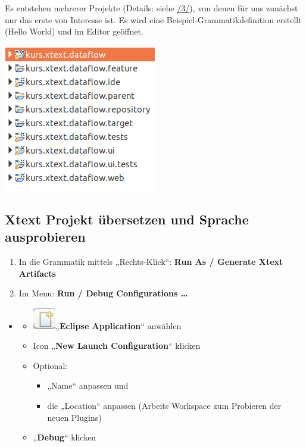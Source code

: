 \documentclass[a4]{article}
\providecommand{\tightlist}{%
  \setlength{\itemsep}{0pt}\setlength{\parskip}{0pt}}
\begin{document}
Es entstehen mehrerer Projekte (Details: siehe
\protect\hyperlink{anchor-3}{/3/}), von denen für uns zunächst nur das
erste von Interesse ist. Es wird eine Beispiel-Grammatikdefinition
erstellt (Hello World) und im Editor geöffnet.

\includegraphics[width=2.63540in,height=2.53110in]{./Pictures/10000201000000FD000000F33F19609DDE80FED7.png}

\subsection[Xtext Projekt übersetzen und Sprache
ausprobieren]{\texorpdfstring{\protect\hypertarget{anchor-19}{}{}Xtext
Projekt übersetzen und Sprache
ausprobieren}{Xtext Projekt übersetzen und Sprache ausprobieren}}\label{xtext-projekt-uxfcbersetzen-und-sprache-ausprobieren}

\begin{enumerate}
\def\labelenumi{\arabic{enumi}.}
\tightlist
\item
  In die Grammatik mittels „Rechts-Klick``: \textbf{Run As / Generate
  Xtext Artifacts} 
\item
  Im Menu: \textbf{Run / Debug Configurations \ldots{}}
\end{enumerate}

\begin{itemize}
\item
  \begin{itemize}
  \item
    \includegraphics[width=0.39290in,height=0.37360in]{./Pictures/10000201000000150000001454902A3E6367315A.png}„\textbf{Eclipse
    Application}`` anwählen
  \item
    Icon „\textbf{New Launch Configuration}`` klicken 
  \item
    Optional:

    \begin{itemize}
    \tightlist
    \item
      „Name`` anpassen und
    \item
      die „Location`` anpassen (Arbeits Workspace zum Probieren der
      neuen Plugins)
    \end{itemize}
  \item
    „\textbf{Debug}`` klicken
  \end{itemize}
\end{itemize}
\end{document}
